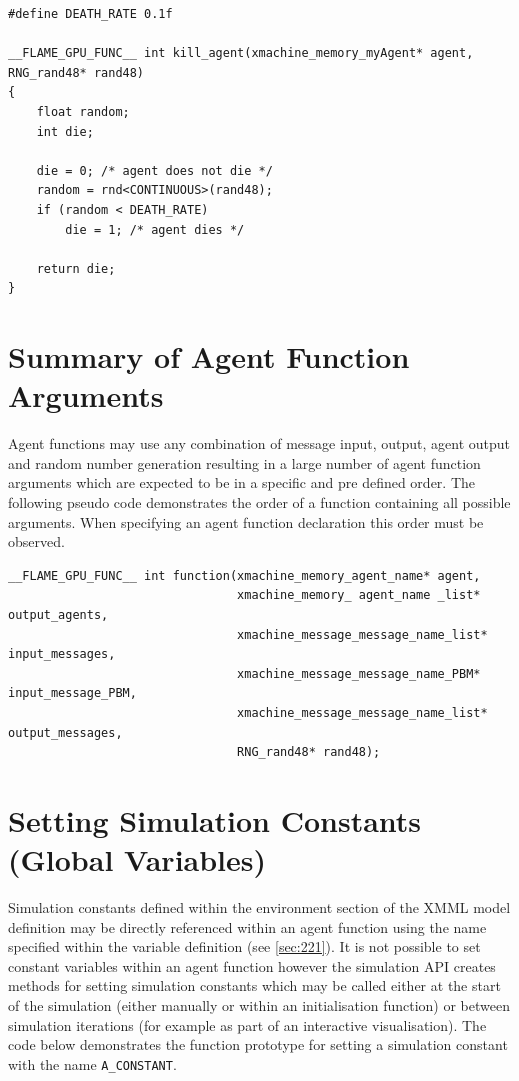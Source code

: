 \documentclass[11pt, a4paper, onecolumn, oneside]{report}
\begin{document}
\begin{verbatim}
#define DEATH_RATE 0.1f

__FLAME_GPU_FUNC__ int kill_agent(xmachine_memory_myAgent* agent, RNG_rand48* rand48)
{
    float random;
    int die;

    die = 0; /* agent does not die */
    random = rnd<CONTINUOUS>(rand48);
    if (random < DEATH_RATE)
        die = 1; /* agent dies */
    
    return die;
}
\end{verbatim}

\section{Summary of Agent Function Arguments}
\label{sec:38}


Agent functions may use any combination of message input, output, agent output and random number generation resulting in a large number of agent function arguments which are expected to be in a specific and pre defined order.
The following pseudo code demonstrates the order of a function containing all possible arguments.
When specifying an agent function declaration this order must be observed.

\begin{verbatim}
__FLAME_GPU_FUNC__ int function(xmachine_memory_agent_name* agent,
                                xmachine_memory_ agent_name _list* output_agents,
                                xmachine_message_message_name_list* input_messages,
                                xmachine_message_message_name_PBM* input_message_PBM,
                                xmachine_message_message_name_list* output_messages,
                                RNG_rand48* rand48);
\end{verbatim}

\section{Setting Simulation Constants (Global Variables)}
\label{sec:39}


Simulation constants defined within the environment section of the XMML model definition may be directly referenced within an agent function using the name specified within the variable definition (see \cref{sec:221}).
It is not possible to set constant variables within an agent function however the simulation API creates methods for setting simulation constants which may be called either at the start of the simulation (either manually or within an initialisation function) or between simulation iterations (for example as part of an interactive visualisation).
The code below demonstrates the function prototype for setting a simulation constant with the name \texttt{A_CONSTANT}.
\end{document}

